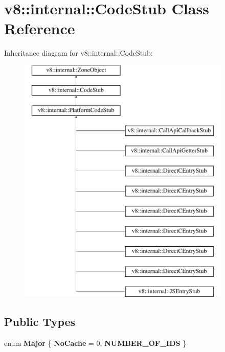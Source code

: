 \hypertarget{classv8_1_1internal_1_1CodeStub}{}\section{v8\+:\+:internal\+:\+:Code\+Stub Class Reference}
\label{classv8_1_1internal_1_1CodeStub}
Inheritance diagram for v8\+:\+:internal\+:\+:Code\+Stub\+:\begin{figure}[H]
\begin{center}
\leavevmode
\includegraphics[height=12.000000cm]{classv8_1_1internal_1_1CodeStub}
\end{center}
\end{figure}
\subsection*{Public Types}
\begin{DoxyCompactItemize}
\item 
\mbox{\label{classv8_1_1internal_1_1CodeStub_abb9bc8d92239cfc2396b3002979de13f}} 
enum {\bfseries Major} \{ {\bfseries No\+Cache} = 0, 
{\bfseries N\+U\+M\+B\+E\+R\+\_\+\+O\+F\+\_\+\+I\+DS}
 \}
\end{DoxyCompactItemize}
